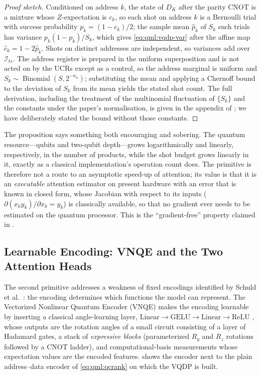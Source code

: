 \begin{proof}[Proof sketch]
Conditioned on address $k$, the state of $D_K$ after the parity CNOT is a mixture whose $Z$-expectation is $c_k$, so each shot on address $k$ is a Bernoulli trial with success probability $p_k = (1 - c_k)/2$; the sample mean $\hat{p}_k$ of $S_k$ such trials has variance $p_k(1-p_k)/S_k$, which gives \cref{eq:qml:vqdp-var} after the affine map $\hat{c}_k = 1 - 2\hat{p}_k$. Shots on distinct addresses are independent, so variances add over $\mathcal{I}_{ts}$. The address register is prepared in the uniform superposition and is not acted on by the UCRs except as a control, so the address marginal is uniform and $S_k \sim \operatorname{Binomial}(S, 2^{-n_a})$; substituting the mean and applying a Chernoff bound to the deviation of $S_k$ from its mean yields the stated shot count. The full derivation, including the treatment of the multinomial fluctuation of $\{S_k\}$ and the constants under the paper's normalisation, is given in the appendix of \cite{guo2025vqt}; we have deliberately stated the bound without those constants.
\end{proof}

The proposition says something both encouraging and sobering. The quantum resource---qubits and two-qubit depth---grows logarithmically and linearly, respectively, in the number of products, while the shot budget grows linearly in it, exactly as a classical implementation's operation count does. The primitive is therefore not a route to an asymptotic speed-up of attention; its value is that it is an \emph{executable} attention estimator on present hardware with an error that is known in closed form, whose Jacobian with respect to its inputs ($\partial (x_k y_k)/\partial x_k = y_k$) is classically available, so that no gradient ever needs to be estimated on the quantum processor. This is the ``gradient-free'' property claimed in \cite{guo2025vqt}.

\subsection{Learnable Encoding: VNQE and the Two Attention Heads}\label{sec:qml:vqt:heads}

The second primitive addresses a weakness of fixed encodings identified by Schuld et al.~\cite{schuld2021encoding}: the encoding determines which functions the model can represent. The Vectorized Nonlinear Quantum Encoder (VNQE) makes the encoding learnable by inserting a classical angle-learning layer, $\mathrm{Linear} \to \mathrm{GELU} \to \mathrm{Linear} \to \mathrm{ReLU}$ \cite{hendrycks2016gelu}, whose outputs are the rotation angles of a small circuit consisting of a layer of Hadamard gates, a stack of \emph{expressive blocks} (parameterized $R_y$ and $R_z$ rotations followed by a CNOT ladder), and computational-basis measurements whose expectation values are the encoded features.  shows the encoder next to the plain address--data encoder of \cref{eq:qml:qcrank} on which the VQDP is built.

